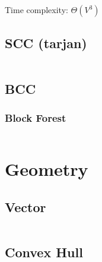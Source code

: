 \documentclass[a4paper, 11pt]{article}   	%
\begin{document}
Time complexity: $\Theta(V^3)$

\subsection{SCC (tarjan)}

\inputminted[breaklines, linenos]{cpp}{graph/scc.cpp}

\subsection{BCC}

\subsubsection{Block Forest}

\inputminted[breaklines, linenos]{cpp}{graph/bf.cpp}

\section{Geometry}

\subsection{Vector}

\inputminted[breaklines, linenos]{cpp}{geo/vec.cpp}

\subsection{Convex Hull}

\inputminted[breaklines, linenos]{cpp}{geo/hull.cpp}
\end{document}
